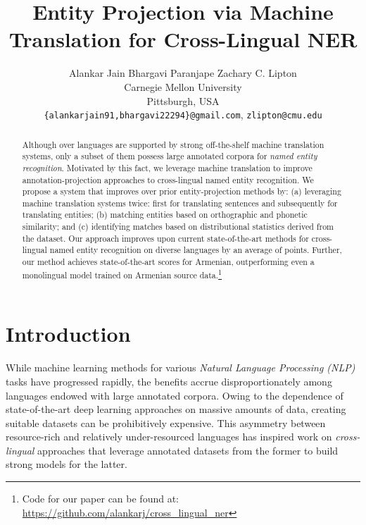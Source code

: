 \documentclass[11pt,a4paper]{article}
\title{Entity Projection via Machine Translation for Cross-Lingual NER
}
\author{Alankar Jain \qquad Bhargavi Paranjape \qquad Zachary C. Lipton \\ 
Carnegie Mellon University \\
Pittsburgh, USA \\
{\tt \{alankarjain91,bhargavi22294\}@gmail.com}, {\tt zlipton@cmu.edu}}
\date{}
\begin{document}
\maketitle

\begin{abstract}
    Although over  languages are supported by strong off-the-shelf machine translation systems, 
only a subset of them possess large annotated corpora for \emph{named entity recognition}.
Motivated by this fact, we leverage machine translation 
to improve annotation-projection approaches to cross-lingual named entity recognition. 
We propose a system that improves over prior entity-projection methods by:
(a) leveraging machine translation systems twice: 
first for translating sentences and subsequently for translating entities;
(b) matching entities based on orthographic and phonetic similarity; and 
(c) identifying matches based on distributional statistics derived from the dataset. 
Our approach improves upon current state-of-the-art methods
for cross-lingual named entity recognition 
on  diverse languages by an average of  points. 
Further, our method achieves state-of-the-art  scores for 
Armenian, outperforming even a monolingual model
trained on Armenian source data.\footnote{Code for our paper can be found at: 
\url{https://github.com/alankarj/cross_lingual_ner}} \end{abstract}

\section{Introduction}
\label{sec:intro}

While machine learning methods for various 
\emph{Natural Language Processing (NLP)} tasks 
have progressed rapidly,
the benefits
accrue disproportionately 
among languages
endowed with large annotated corpora.
Owing to the dependence of state-of-the-art deep learning approaches 
on massive amounts of data,
creating suitable datasets can be prohibitively expensive. 
This asymmetry between resource-rich and 
relatively under-resourced languages
has inspired work on \emph{cross-lingual} approaches 
that leverage annotated datasets from the former
to build strong models for the latter. 
\end{document}
